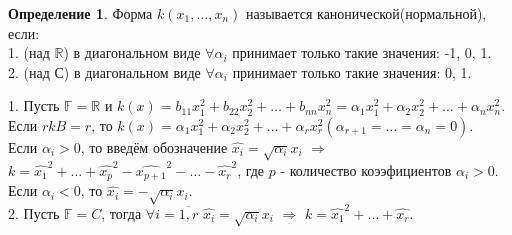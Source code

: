 \documentclass[a4paper, 12pt]{article}
\newcommand{\R}{\mathbb R}
\newcommand{\F}{\mathbb F}
\theoremstyle{definition}
\newtheorem*{definition}{Определение}
\theoremstyle{plain}
\theoremstyle{remark}
\begin{document}
  \begin{definition}
    Форма $k(x_1,\ldots,x_n)$ называется канонической(нормальной), если:\\
    1. (над $\R$) в диагональном виде $\forall \alpha_i$ принимает только такие значения: -1, 0, 1.\\
    2. (над $С$) в диагональном виде $\forall \alpha_i$ принимает только такие значения: 0, 1.
  \end{definition}
  1. Пусть $\F=\R$ и $k(x)=b_{11}x_1^2+b_{22}x_2^2+\ldots+b_{nn}x_n^2 = \alpha_1x_1^2+\alpha_2x_2^2+\ldots+\alpha_nx_n^2$.\\ 
  Если $rkB=r$, то $k(x)=\alpha_1x_1^2+\alpha_2x_2^2+\ldots+\alpha_rx_r^2(\alpha_{r+1}=\ldots=\alpha_n=0)$.\\
  Если $\alpha_i>0$, то введём обозначение $\widehat{x_i}=\sqrt{\alpha_i}x_i$ $\Longrightarrow$ $k=\widehat{x_1}^2+\ldots+\widehat{x_p}^2-\widehat{x_{p+1}}^2-\ldots-\widehat{x_r}^2$, где $p$ - количество коээфициентов $\alpha_i>0$.\\
  Если $\alpha_i < 0$, то $\widehat{x_i} = -\sqrt{\alpha_i}x_i$.\\
  2. Пусть $\F=C$, тогда $\forall i=\overline{1,r}$ $\widehat{x_i}=\sqrt{\alpha_i}x_i$ $\Longrightarrow$ $k=\widehat{x_1}^2+\ldots+\widehat{x_r}$.
\end{document}
